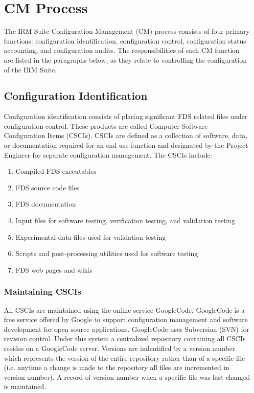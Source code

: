\documentclass[11pt]{book}
\begin{document}
\chapter{CM Process}

The IRM Suite Configuration Management (CM) process consists of four primary functions: configuration
identification, configuration control, configuration status accounting, and configuration audits.
The responsibilities of each CM function are listed in the paragraphs below, as they relate to
controlling the configuration of the IRM Suite.

\section{Configuration Identification}

Configuration identification consists of placing significant FDS related files under configuration control.
These products are called Computer Software Configuration Items (CSCIs).  CSCIs are defined as a collection
of software, data, or documentation required for an end use function and designated by the Project Engineer
for separate configuration management.  The CSCIs include:

\begin{enumerate}

\item Compiled FDS executables
\item FDS source code files
\item FDS documentation
\item Input files for software testing, verification testing, and validation testing
\item Experimental data files used for validation testing
\item Scripts and post-processing utilities used for software testing
\item FDS web pages and wikis

\end{enumerate}

\subsection{Maintaining CSCIs}

All CSCIs are maintained using the online service GoogleCode.  GoogleCode is a free service offered by Google
to support configuration management and software development for open source applications.  GoogleCode uses 
Subversion (SVN) for revision control.  Under this system a centralized repository containing all CSCIs resides
on a GoogleCode server.  Versions are indentified by a version number which represents the version of the
entire repository rather than of a specific file (i.e. anytime a change is made to the repository all files are
incremented in version number).  A record of version number when a specific file was last changed is maintained.
\end{document}
